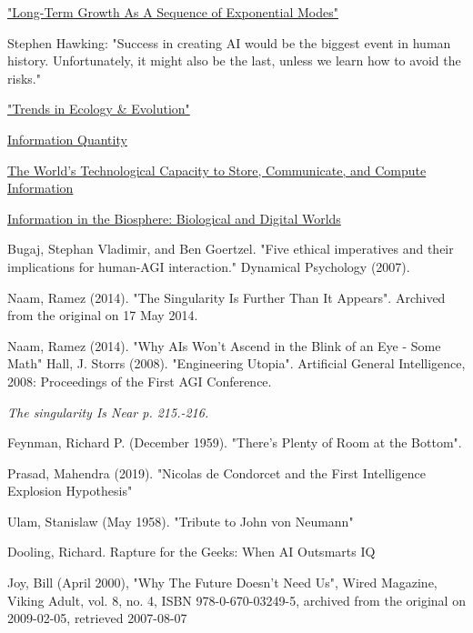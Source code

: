 \documentclass[a4paper]{article}
\begin{document}
\begin{thebibliography}{9}
\href{http://hanson.gmu.edu/longgrow.pdf}{"Long-Term Growth As A Sequence of Exponential Modes"}

Stephen Hawking: "Success in creating AI would be the biggest event in human history. Unfortunately, it might also be the last, unless we learn how to avoid the risks."

\href{https://www.sciencedirect.com/science/article/abs/pii/S0169534703003458}{"Trends in Ecology \& Evolution"}

\href{http://www.martinhilbert.net/wp-content/uploads/2018/07/Hilbert2017_ReferenceWorkEntry_InformationQuantity.pdf}{Information Quantity}

\href{https://www.science.org/doi/10.1126/science.1200970}{The World’s Technological Capacity to Store, Communicate, and Compute Information}

\href{https://escholarship.org/uc/item/38f4b791}{Information in the Biosphere: Biological and Digital Worlds}

  Bugaj, Stephan Vladimir, and Ben Goertzel. "Five ethical imperatives and their implications for human-AGI interaction." Dynamical Psychology (2007).

Naam, Ramez (2014). "The Singularity Is Further Than It Appears". Archived from the original on 17 May 2014. 

 Naam, Ramez (2014). "Why AIs Won't Ascend in the Blink of an Eye - Some Math"
 Hall, J. Storrs (2008). "Engineering Utopia". Artificial General Intelligence, 2008: Proceedings of the First AGI Conference.

 \textit{The singularity Is Near p. 215.-216.}

 Feynman, Richard P. (December 1959). "There's Plenty of Room at the Bottom".

Prasad, Mahendra (2019). "Nicolas de Condorcet and the First Intelligence Explosion Hypothesis"

 Ulam, Stanislaw (May 1958). "Tribute to John von Neumann"

 Dooling, Richard. Rapture for the Geeks: When AI Outsmarts IQ

Joy, Bill (April 2000), "Why The Future Doesn't Need Us", Wired Magazine, Viking Adult, vol. 8, no. 4, ISBN 978-0-670-03249-5, archived from the original on 2009-02-05, retrieved 2007-08-07


\end{thebibliography}
\end{document}
